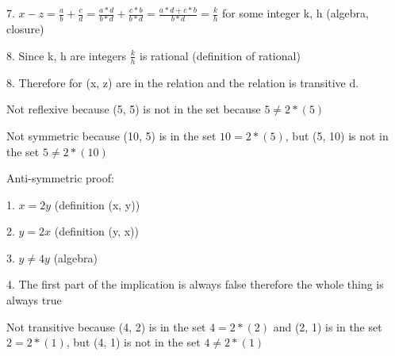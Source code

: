 \documentclass[12pt]{article}
\begin{document}
7. $x - z = \frac{a}{b} + \frac{c}{d} = \frac{a*d}{b*d} + \frac{c*b}{b*d} = \frac{a*d+c*b}{b*d} = \frac{k}{h}$ for some integer k, h (algebra, closure)

8. Since k, h are integers $\frac{k}{h}$ is rational (definition of rational)

8. Therefore for (x, z) are in the relation and the relation is transitive
\newline
d.

Not reflexive because (5, 5) is not in the set because $5 \neq 2*(5)$

Not symmetric because (10, 5) is in the set $10 = 2*(5)$, but (5, 10) is not in the set $5 \neq 2*(10)$

Anti-symmetric proof:

1. $x = 2y$ (definition (x, y))

2. $y = 2x$ (definition (y, x))

3. $y \neq 4y$ (algebra)

4. The first part of the implication is always false therefore the whole thing is always true

Not transitive because (4, 2) is in the set $4 = 2*(2)$ and (2, 1) is in the set $2 = 2*(1)$, but (4, 1) is not in the set $4 \neq 2*(1)$
\end{document}
